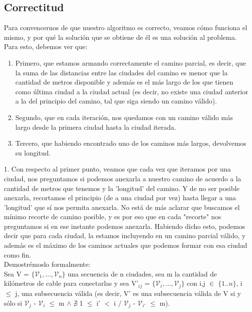 \documentclass{article}
\theoremstyle{definition}
\theoremstyle{remark}
\begin{document}
\subsection{Correctitud}
Para convencernos de que nuestro algoritmo es correcto, veamos cómo funciona el mismo, y por qué la solución que se obtiene de él es una solución al problema. \\ 
Para esto, debemos ver que: 
\begin{enumerate}
\item Primero, que estamos armando correctamente el camino parcial, es decir, que la suma de las distancias entre las ciudades del camino es menor que la cantidad de metros disponible y además es el más largo de los que tienen como última ciudad a la ciudad actual (es decir, no existe una ciudad anterior a la del principio del camino, tal que siga siendo un camino válido).
\item Segundo, que en cada iteración, nos quedamos con un camino válido más largo desde la primera ciudad hasta la ciudad iterada.
\item Tercero, que habiendo encontrado uno de los caminos más largos, devolvemos su longitud.
\end{enumerate}

1. Con respecto al primer punto, veamos que cada vez que iteramos por una ciudad, nos preguntamos si podemos anexarla a nuestro camino de acuerdo a la cantidad de metros que tenemos y la 'longitud' del camino. Y de no ser posible anexarla, recortamos el principio (de a una ciudad por vez) hasta llegar a una 'longitud' que sí nos permita anexarla. No está de más aclarar que buscamos el mínimo recorte de camino posible, y es por eso que en cada "recorte" nos preguntamos si en ese instante podemos anexarla. Habiendo dicho esto, podemos decir que para cada ciudad, la estamos incluyendo en un camino parcial válido, y además es el máximo de los caminos actuales que podemos formar con esa ciudad como fin. \\

Demostrémoslo formalmente: \\

Sea V = $\{\mathcal{V}_1,..., \mathcal{V}_n\}$ una secuencia de n ciudades, sea m la cantidad de kilómetros de cable para conectarlas y sea V'$_{ij}$ = $\{\mathcal{V}_i,..., \mathcal{V}_j\}$ con i,j $\in$ $\{1..n\}$, i $\leq$ j, una subsecuencia válida (es decir, V' es una subsecuencia válida de V si y sólo si $\mathcal{V}_j$ - $\mathcal{V}_i$ $\leq$ m $\wedge$ $\nexists$ 1 $\leq$ i' $<$ i $/$ $\mathcal{V}_j$ - $\mathcal{V}_{i'}$ $\leq$ m). \\
\end{document}
